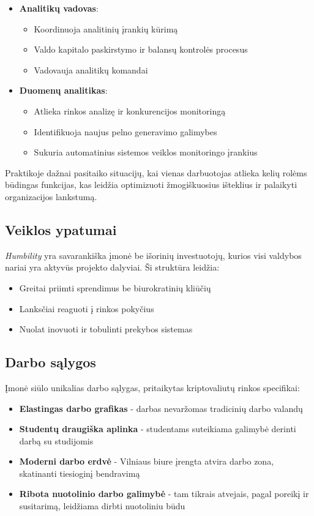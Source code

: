 \documentclass[]{VUMIFTemplateClass}
\begin{document}
\begin{itemize}
\item \textbf{Analitikų vadovas}:
\begin{itemize}
\item Koordinuoja analitinių įrankių kūrimą
\item Valdo kapitalo paskirstymo ir balansų kontrolės procesus
\item Vadovauja analitikų komandai
\end{itemize}

\item \textbf{Duomenų analitikas}:
\begin{itemize}
\item Atlieka rinkos analizę ir konkurencijos monitoringą
\item Identifikuoja naujus pelno generavimo galimybes
\item Sukuria automatinius sistemos veiklos monitoringo įrankius
\end{itemize}

\end{itemize}

Praktikoje dažnai pasitaiko situacijų, kai vienas darbuotojas atlieka kelių rolėms būdingas funkcijas, kas leidžia optimizuoti žmogiškuosius išteklius ir palaikyti organizacijos lankstumą.

\subsection{Veiklos ypatumai}
\textit{Humbility} yra savarankiška įmonė be išorinių investuotojų, kurios visi valdybos nariai yra aktyvūs projekto dalyviai. Ši struktūra leidžia:
\begin{itemize}
\item Greitai priimti sprendimus be biurokratinių kliūčių
\item Lanksčiai reaguoti į rinkos pokyčius
\item Nuolat inovuoti ir tobulinti prekybos sistemas
\end{itemize}

\subsection{Darbo sąlygos}
Įmonė siūlo unikalias darbo sąlygas, pritaikytas kriptovaliutų rinkos specifikai:
\begin{itemize}
\item \textbf{Elastingas darbo grafikas} - darbas nevaržomas tradicinių darbo valandų
\item \textbf{Studentų draugiška aplinka} - studentams suteikiama galimybė derinti darbą su studijomis
\item \textbf{Moderni darbo erdvė} - Vilniaus biure įrengta atvira darbo zona, skatinanti tiesioginį bendravimą
\item \textbf{Ribota nuotolinio darbo galimybė} - tam tikrais atvejais, pagal poreikį ir susitarimą, leidžiama dirbti nuotoliniu būdu
\end{itemize}
\end{document}
